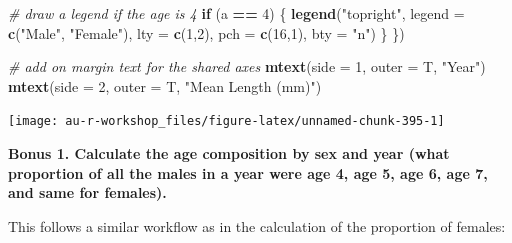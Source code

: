 \documentclass[]{book}
\newenvironment{Shaded}{\begin{snugshade}}{\end{snugshade}}
\newcommand{\KeywordTok}[1]{\textcolor[rgb]{0.13,0.29,0.53}{\textbf{#1}}}
\newcommand{\DataTypeTok}[1]{\textcolor[rgb]{0.13,0.29,0.53}{#1}}
\newcommand{\DecValTok}[1]{\textcolor[rgb]{0.00,0.00,0.81}{#1}}
\newcommand{\StringTok}[1]{\textcolor[rgb]{0.31,0.60,0.02}{#1}}
\newcommand{\CommentTok}[1]{\textcolor[rgb]{0.56,0.35,0.01}{\textit{#1}}}
\newcommand{\ControlFlowTok}[1]{\textcolor[rgb]{0.13,0.29,0.53}{\textbf{#1}}}
\newcommand{\OperatorTok}[1]{\textcolor[rgb]{0.81,0.36,0.00}{\textbf{#1}}}
\newcommand{\NormalTok}[1]{#1}
\theoremstyle{definition}
\theoremstyle{definition}
\theoremstyle{definition}
\theoremstyle{remark}
\begin{document}
\begin{Shaded}
\begin{Highlighting}[]
  \CommentTok{# draw a legend if the age is 4}
  \ControlFlowTok{if}\NormalTok{ (a }\OperatorTok{==}\StringTok{ }\DecValTok{4}\NormalTok{) \{}
    \KeywordTok{legend}\NormalTok{(}\StringTok{"topright"}\NormalTok{, }\DataTypeTok{legend =} \KeywordTok{c}\NormalTok{(}\StringTok{"Male"}\NormalTok{, }\StringTok{"Female"}\NormalTok{),}
           \DataTypeTok{lty =} \KeywordTok{c}\NormalTok{(}\DecValTok{1}\NormalTok{,}\DecValTok{2}\NormalTok{), }\DataTypeTok{pch =} \KeywordTok{c}\NormalTok{(}\DecValTok{16}\NormalTok{,}\DecValTok{1}\NormalTok{), }\DataTypeTok{bty =} \StringTok{"n"}\NormalTok{)}
\NormalTok{  \}}
\NormalTok{\})}

\CommentTok{# add on margin text for the shared axes}
\KeywordTok{mtext}\NormalTok{(}\DataTypeTok{side =} \DecValTok{1}\NormalTok{, }\DataTypeTok{outer =}\NormalTok{ T, }\StringTok{"Year"}\NormalTok{)}
\KeywordTok{mtext}\NormalTok{(}\DataTypeTok{side =} \DecValTok{2}\NormalTok{, }\DataTypeTok{outer =}\NormalTok{ T, }\StringTok{"Mean Length (mm)"}\NormalTok{)}
\end{Highlighting}
\end{Shaded}

\begin{center}\texttt{[image: au-r-workshop\_files/figure-latex/unnamed-chunk-395-1]} \end{center}

\textbf{Bonus 1. Calculate the age composition by sex and year (what
proportion of all the males in a year were age 4, age 5, age 6, age 7,
and same for females).}

This follows a similar workflow as in the calculation of the proportion
of females:

\begin{Shaded}
\end{Shaded}
\end{document}
